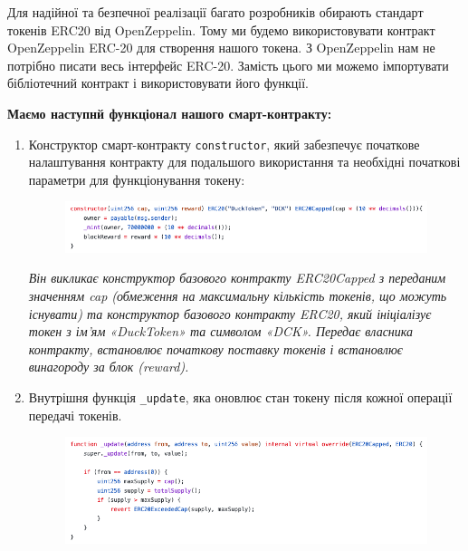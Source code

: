 \vspace{0.5cm}
Для надійної та безпечної реалізації багато розробників обирають стандарт токенів ERC20 від OpenZeppelin. Тому ми будемо використовувати контракт OpenZeppelin ERC-20 для створення нашого токена. З OpenZeppelin нам не потрібно писати весь інтерфейс ERC-20. Замість цього ми можемо імпортувати бібліотечний контракт і використовувати його функції.

\newpage
\textbf{Маємо наступнй функціонал нашого смарт-контракту:}

\begin{enumerate}

    \item Конструктор смарт-контракту \texttt{constructor}, який забезпечує початкове налаштування контракту для подальшого використання та необхідні початкові параметри для функціонування токену:

    \begin{figure}[ht]
        \centering
        \includegraphics[scale=0.6]{IMAGES/code1.png}
        \label{fig_vsc}
    \end{figure}
    
    \textit{Він викликає конструктор базового контракту ERC20Capped з переданим значенням cap (обмеження на максимальну кількість токенів, що можуть існувати) та конструктор базового контракту ERC20, який ініціалізує токен з ім'ям «DuckToken» та символом «DCK». Передає власника контракту, встановлює початкову поставку токенів і встановлює винагороду за блок (reward).}
    
    \item Внутрішня функція \texttt{\_update}, яка оновлює стан токену після кожної операції передачі токенів.
    
    \begin{figure}[ht]
        \centering
        \includegraphics[scale=0.6]{IMAGES/code2.png}
        \label{fig_vsc}
    \end{figure}


\end{enumerate}

